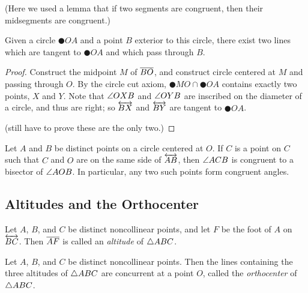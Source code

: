 (Here we used a lemma that if two segments are congruent, then their midsegments are congruent.)

\begin{construct}
Given a circle \(\CIRCLE{O}{A}\) and a point \(B\) exterior to this circle, there exist two lines which are tangent to \(\CIRCLE{O}{A}\) and which pass through \(B\).
\end{construct}

\begin{proof}
Construct the midpoint \(M\) of \(\overline{BO}\), and construct circle centered at \(M\) and passing through \(O\).
By the circle cut axiom, \(\CIRCLE{M}{O} \cap \CIRCLE{O}{A}\) contains exactly two points, \(X\) and \(Y\).
Note that \(\angle{OXB}\) and \(\angle{OYB}\) are inscribed on the diameter of a circle, and thus are right; so \(\overleftrightarrow{BX}\) and \(\overleftrightarrow{BY}\) are tangent to \(\CIRCLE{O}{A}\).

(still have to prove these are the only two.)
\end{proof}

\begin{prop}
Let \(A\) and \(B\) be distinct points on a circle centered at \(O\).
If \(C\) is a point on \(C\) such that \(C\) and \(O\) are on the same side of \(\overleftrightarrow{AB}\), then \(\angle{ACB}\) is congruent to a bisector of \(\angle{AOB}\).
In particular, any two such points form congruent angles.
\end{prop}

\subsection*{Altitudes and the Orthocenter}

\begin{dfn}
Let \(A\), \(B\), and \(C\) be distinct noncollinear points, and let \(F\) be the foot of \(A\) on \(\overleftrightarrow{BC}\).
Then \(\overline{AF}\) is called an \emph{altitude} of \(\bigtriangleup{ABC}\).
\end{dfn}

\begin{prop}
Let \(A\), \(B\), and \(C\) be distinct noncollinear points.
Then the lines containing the three altitudes of \(\bigtriangleup{ABC}\) are concurrent at a point \(O\), called the \emph{orthocenter} of \(\bigtriangleup{ABC}\).
\end{prop}
